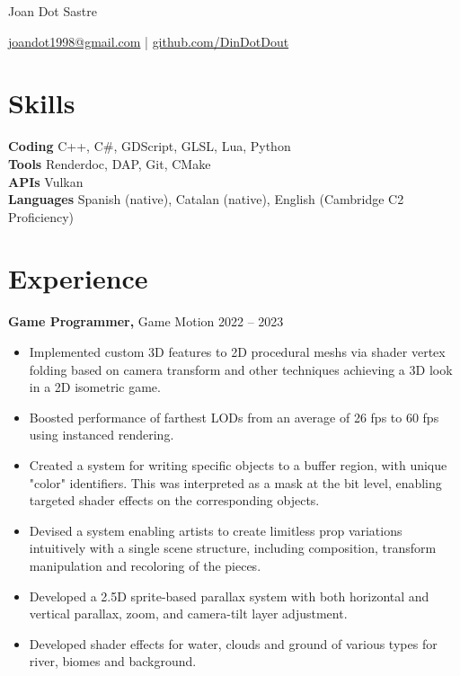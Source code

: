 \documentclass[10pt]{article}       %
\begin{document}
\centerline{\Huge Joan Dot Sastre}

\vspace{5pt}

\centerline{\href{mailto:joandot1998@gmail.com}{joandot1998@gmail.com} | \href{https://github.com/DinDotDout}{github.com/DinDotDout}}

\vspace{-10pt}

\section*{Skills}
\textbf{Coding} C++, C\#, GDScript, GLSL, Lua, Python \\
\textbf{Tools} Renderdoc, DAP, Git, CMake \\
\textbf{APIs} Vulkan \\
\textbf{Languages} Spanish (native), Catalan (native), English (Cambridge C2 Proficiency)

\vspace{-6.5pt}

\section*{Experience}
\textbf{Game Programmer,} {Game Motion} \hfill 2022 -- 2023\\
\vspace{-9pt}
\begin{itemize}
	\item Implemented custom 3D features to 2D procedural meshs via shader vertex folding based
        on camera transform and other techniques achieving a 3D look in a 2D isometric game.
	\item Boosted performance of farthest LODs from an average of 26 fps to 60 fps using instanced rendering.
	\item Created a system for writing specific objects to a buffer region, with
        unique "color" identifiers. This was interpreted as a mask at the bit level,
        enabling targeted shader effects on the corresponding objects.
	\item Devised a system enabling artists to create limitless prop variations intuitively with
        a single scene structure, including composition, transform manipulation and recoloring of the pieces.
	\item Developed a 2.5D sprite-based parallax system with both horizontal and vertical
        parallax, zoom, and camera-tilt layer adjustment.
	\item Developed shader effects for water, clouds and ground of various types for river, biomes and background.

\end{itemize}
\end{document}

